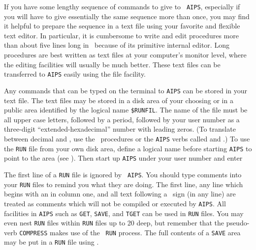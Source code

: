      If you have some lengthy sequence of commands to give to {\tt
AIPS}, especially if you will have to give essentially the same
sequence more than once, you may find it helpful to prepare the
sequence in a text file using your favorite and flexible text editor.
In particular, it is cumbersome to write and edit procedures more than
about five lines long in \AIPS\ because of its primitive internal
editor.  Long procedures are best written as text files at your
computer's monitor level, where the editing facilities will usually be
much better.  These text files can be transferred to {\tt AIPS} easily
using the {\tt {}} file facility.

      Any commands that can be typed on the terminal to {\tt AIPS} can
be stored in your text file.  The text files may be stored in a disk
area of your choosing or in a public area identified by the logical
name \hbox{{\tt \$RUNFIL}}.  The name of the file must be all upper
case letters, followed by a period, followed by your user number as a
three-digit ``extended-hexadecimal'' number with leading zeros.  (To
translate between decimal and , use the
\AIPS\ procedures or the {\tt AIPS} verbs called {\tt {}} and
\hbox{{\tt {}}}.)  To use the {\tt RUN} file from your own
disk area, define a logical name before starting {\tt AIPS} to point
to the area (see ).  Then start up {\tt AIPS} under your
user number and enter

     The first line of a {\tt RUN} file is ignored by \hbox{{\tt
AIPS}}.  You should type comments into your {\tt RUN} files to remind
you what they are doing.  The first line, any line which begins with
an {\tt *} in column one, and all text following a \dol\ sign (in any
line) are treated as comments which will not be compiled or executed
by \hbox{{\tt AIPS}}.  All facilities in {\tt AIPS} such as {\tt GET},
{\tt SAVE}, and {\tt TGET} can be used in {\tt RUN} files.  You
may even nest {\tt RUN} files within {\tt RUN} files up to 20 deep,
but remember that the pseudo-verb {\tt COMPRESS} makes use of the {\tt
RUN} process.  The full contents of a {\tt SAVE} area may be put in a
{\tt RUN} file using {\tt {}}\@.

